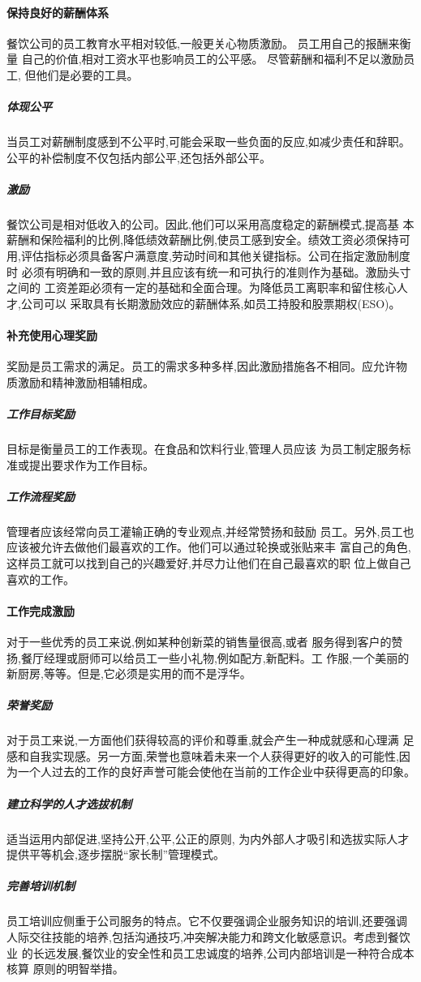 \paragraph{保持良好的薪酬体系}
餐饮公司的员工教育水平相对较低,一般更关心物质激励。 员工用自己的报酬来衡量
自己的价值,相对工资水平也影响员工的公平感。 尽管薪酬和福利不足以激励员工,
但他们是必要的工具。
\subparagraph{ 体现公平 }
当员工对薪酬制度感到不公平时,可能会采取一些负面的反应,如减少责任和辞职。
公平的补偿制度不仅包括内部公平,还包括外部公平。
\subparagraph{ 激励 }
餐饮公司是相对低收入的公司。因此,他们可以采用高度稳定的薪酬模式,提高基
本薪酬和保险福利的比例,降低绩效薪酬比例,使员工感到安全。绩效工资必须保持可
用,评估指标必须具备客户满意度,劳动时间和其他关键指标。公司在指定激励制度时
必须有明确和一致的原则,并且应该有统一和可执行的准则作为基础。激励头寸之间的
工资差距必须有一定的基础和全面合理。为降低员工离职率和留住核心人才,公司可以
采取具有长期激励效应的薪酬体系,如员工持股和股票期权(ESO)。

\paragraph{补充使用心理奖励}
奖励是员工需求的满足。员工的需求多种多样,因此激励措施各不相同。应允许物
质激励和精神激励相辅相成。
\subparagraph{ 工作目标奖励 }
目标是衡量员工的工作表现。在食品和饮料行业,管理人员应该
为员工制定服务标准或提出要求作为工作目标。
\subparagraph{ 工作流程奖励 }
管理者应该经常向员工灌输正确的专业观点,并经常赞扬和鼓励
员工。另外,员工也应该被允许去做他们最喜欢的工作。他们可以通过轮换或张贴来丰
富自己的角色,这样员工就可以找到自己的兴趣爱好,并尽力让他们在自己最喜欢的职
位上做自己喜欢的工作。

\paragraph{工作完成激励}
对于一些优秀的员工来说,例如某种创新菜的销售量很高,或者
服务得到客户的赞扬,餐厅经理或厨师可以给员工一些小礼物,例如配方,新配料。工
作服,一个美丽的新厨房,等等。但是,它必须是实用的而不是浮华。
\subparagraph{ 荣誉奖励 }
对于员工来说,一方面他们获得较高的评价和尊重,就会产生一种成就感和心理满
足感和自我实现感。另一方面,荣誉也意味着未来一个人获得更好的收入的可能性,因
为一个人过去的工作的良好声誉可能会使他在当前的工作企业中获得更高的印象。
\subparagraph{ 建立科学的人才选拔机制 }
适当运用内部促进,坚持公开,公平,公正的原则,
为内外部人才吸引和选拔实际人才提供平等机会,逐步摆脱“家长制”管理模式。
\subparagraph{ 完善培训机制 }
员工培训应侧重于公司服务的特点。它不仅要强调企业服务知识的培训,还要强调
人际交往技能的培养,包括沟通技巧,冲突解决能力和跨文化敏感意识。考虑到餐饮业
的长远发展,餐饮业的安全性和员工忠诚度的培养,公司内部培训是一种符合成本核算
原则的明智举措。
